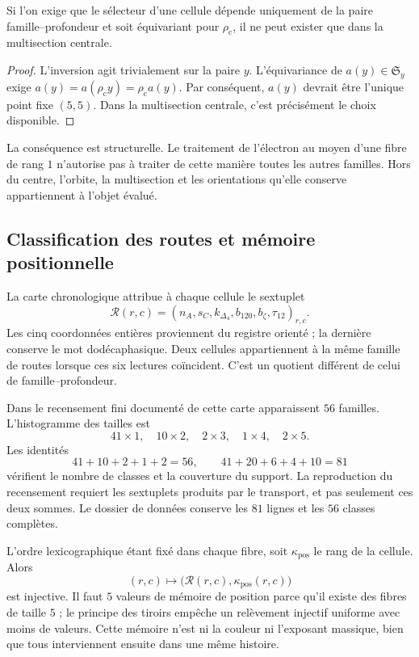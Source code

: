 \begin{proposition}
Si l’on exige que le sélecteur d’une cellule dépende uniquement de la paire
famille--profondeur et soit équivariant pour \(\rho_{\mathrm c}\), il ne
peut exister que dans la multisection centrale.
\end{proposition}
\begin{proof}
L’inversion agit trivialement sur la paire \(y\). L’équivariance de
\(a(y)\in\mathfrak S_y\) exige
\(a(y)=a(\rho_{\mathrm c}y)=\rho_{\mathrm c}a(y)\).
Par conséquent, \(a(y)\) devrait être l’unique point fixe \((5,5)\).
Dans la multisection centrale, c’est précisément le choix disponible.
\end{proof}

La conséquence est structurelle. Le traitement de l'électron au moyen d'une
fibre de rang \(1\) n'autorise pas à traiter de cette manière toutes les autres
familles. Hors du centre, l'orbite, la multisection et les orientations
qu'elle conserve appartiennent à l'objet évalué.

\subsection{Classification des routes et mémoire positionnelle}

La carte chronologique attribue à chaque cellule le sextuplet
\[
 \mathcal R(r,c)=
 (n_A,s_C,k_{\Delta_4},b_{120},b_{\zeta},\tau_{12})_{r,c}.
\]
Les cinq coordonnées entières proviennent du registre orienté ; la dernière
conserve le mot dodécaphasique. Deux cellules appartiennent à la même famille
de routes lorsque ces six lectures coïncident. C'est un quotient différent
de celui de famille--profondeur.

Dans le recensement fini documenté de cette carte apparaissent \(56\) familles.
L'histogramme des tailles est
\[
 41\times1,\quad10\times2,\quad2\times3,\quad1\times4,\quad2\times5.
\]
Les identités
\[
 41+10+2+1+2=56,\qquad
 41+20+6+4+10=81
\]
vérifient le nombre de classes et la couverture du support. La reproduction
du recensement requiert les sextuplets produits par le transport, et pas seulement ces
deux sommes. Le dossier de données conserve les \(81\) lignes et les
\(56\) classes complètes.

L’ordre lexicographique étant fixé dans chaque fibre, soit \(\kappa_{\mathrm{pos}}\)
le rang de la cellule. Alors
\[
 (r,c)\longmapsto\bigl(\mathcal R(r,c),\kappa_{\mathrm{pos}}(r,c)\bigr)
\]
est injective. Il faut \(5\) valeurs de mémoire de position parce qu’il
existe des fibres de taille \(5\) ; le principe des tiroirs empêche un
relèvement injectif uniforme avec moins de valeurs. Cette mémoire n’est ni la couleur
ni l’exposant massique, bien que tous interviennent ensuite dans une même histoire.

